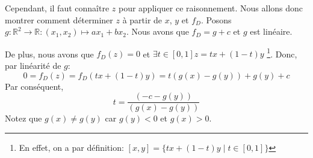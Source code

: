 Cependant, il faut connaître $z$ pour appliquer ce raisonnement. Nous allons
donc montrer comment déterminer $z$ à partir de $x$, $y$ et $f_D$.
Posons $g: \mathbb{R}^2 \to \mathbb{R}: (x_1, x_2)\mapsto a x_1 + b x_2$.
Nous avons que $f_D = g + c $ et $g$ est linéaire.

De plus, nous avons que $f_D(z) = 0$ et $\exists t \in [0,1] z = tx+ (1-t)y$
\footnote{En effet, on a par définition: $[x, y] = \{tx + (1 - t)y\mid t\in [0,1]\}$}.
Donc, par linéarité de $g$:
$$0 = f_D(z)  = f_D (tx+ (1-t)y) = t(g(x)-g(y))+g(y)+c$$
Par conséquent, $$t = \frac{(-c - g(y))}{(g(x)-g(y))}$$
Notez que $g(x) \neq g(y)$ car $ g(y) < 0 $ et $g(x) > 0$.
